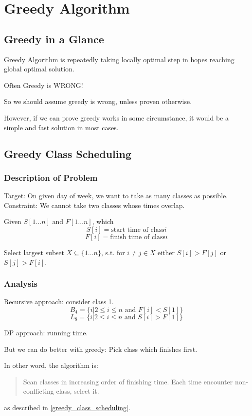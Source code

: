\section{Greedy Algorithm}

\subsection{Greedy in a Glance}

Greedy Algorithm is repeatedly taking locally optimal step in
hopes reaching global optimal solution.

Often Greedy is WRONG!

So we should assume greedy is wrong, unless proven otherwise.

However, if we can prove greedy works in some circumstance,
it would be a simple and fast solution in most cases.

\subsection{Greedy Class Scheduling}
\subsubsection{Description of Problem}

Target: On given day of week, we want to take as many classes as possible.
Constraint: We cannot take two classes whose times overlap.

\AlgoInput Given $S[1 \ldots n]$ and $F[1 \ldots n]$, which 
\[S[i] = \text{start time of class} i \]
\[F[i] = \text{finish time of class} i \]

\AlgoOutput Select largest subset $X \subseteq \{1 \ldots n \}$,
s.t. for $i \neq j \in X$ either $S[i] > F[j]$ or $S[j] > F[i]$.

\subsubsection{Analysis}
Recursive approach: consider class 1.
\[B_4 = \{ i | 2 \leq i \leq n \text{ and } F[i] < S[1] \}\]
\[L_8 = \{ i | 2 \leq i \leq n \text{ and } S[i] > F[1] \}\]

DP approach:  running time.

But we can do better with greedy: Pick class which finishes first.

In other word, the algorithm is:
\begin{quote}
    Scan classes in increasing order of finishing time.
    Each time encounter non-conflicting class, select it.
\end{quote}
as described in \cref{greedy_class_scheduling}.

